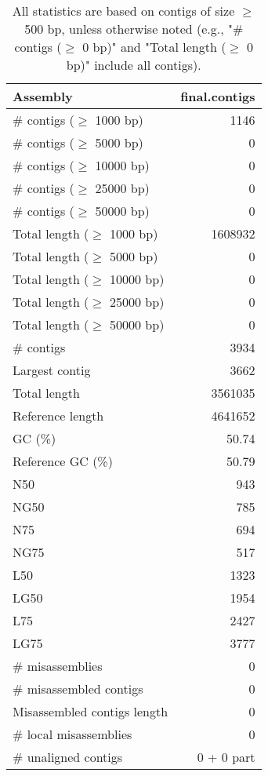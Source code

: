 \documentclass[12pt,a4paper]{article}
\begin{document}
\begin{table}[ht]
\begin{center}
\caption{All statistics are based on contigs of size $\geq$ 500 bp, unless otherwise noted (e.g., "\# contigs ($\geq$ 0 bp)" and "Total length ($\geq$ 0 bp)" include all contigs).}
\begin{tabular}{|l*{1}{|r}|}
\hline
Assembly & final.contigs \\ \hline
\# contigs ($\geq$ 1000 bp) & 1146 \\ \hline
\# contigs ($\geq$ 5000 bp) & 0 \\ \hline
\# contigs ($\geq$ 10000 bp) & 0 \\ \hline
\# contigs ($\geq$ 25000 bp) & 0 \\ \hline
\# contigs ($\geq$ 50000 bp) & 0 \\ \hline
Total length ($\geq$ 1000 bp) & 1608932 \\ \hline
Total length ($\geq$ 5000 bp) & 0 \\ \hline
Total length ($\geq$ 10000 bp) & 0 \\ \hline
Total length ($\geq$ 25000 bp) & 0 \\ \hline
Total length ($\geq$ 50000 bp) & 0 \\ \hline
\# contigs & 3934 \\ \hline
Largest contig & 3662 \\ \hline
Total length & 3561035 \\ \hline
Reference length & 4641652 \\ \hline
GC (\%) & 50.74 \\ \hline
Reference GC (\%) & 50.79 \\ \hline
N50 & 943 \\ \hline
NG50 & 785 \\ \hline
N75 & 694 \\ \hline
NG75 & 517 \\ \hline
L50 & 1323 \\ \hline
LG50 & 1954 \\ \hline
L75 & 2427 \\ \hline
LG75 & 3777 \\ \hline
\# misassemblies & 0 \\ \hline
\# misassembled contigs & 0 \\ \hline
Misassembled contigs length & 0 \\ \hline
\# local misassemblies & 0 \\ \hline
\# unaligned contigs & 0 + 0 part \\ \hline

\end{tabular}
\end{center}
\end{table}
\end{document}
